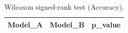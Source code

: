 \begin{table}[t]
\centering
\begin{tabular}{lll}
\toprule
Model_A & Model_B & p_value \\
\midrule
\bottomrule
\end{tabular}
\caption{Wilcoxon signed-rank test (Accuracy).}
\label{tab:wilcoxon_Accuracy}
\end{table}